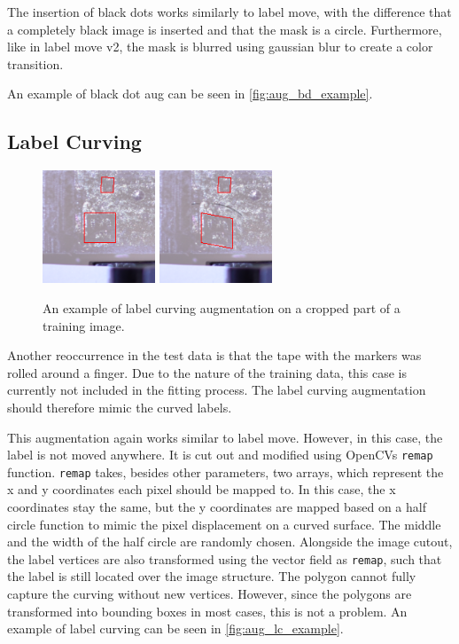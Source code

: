 \documentclass[10pt]{book}
\newcommand{\figureref}[1]{\autoref{#1}}
\begin{document}
The insertion of black dots works similarly to label move, with the difference that a completely black image is inserted and that the mask is a circle. Furthermore, like in label move v2, the mask is blurred using gaussian blur to create a color transition.

An example of black dot aug can be seen in \figureref{fig:aug_bd_example}.

\subsection{Label Curving}
\label{sec:label_curving}

\begin{figure}
  \centering
     {\includegraphics[width=0.3\textwidth]{image/aug_lc_before}}
     {\includegraphics[width=0.3\textwidth]{image/aug_lc_after}}
  \caption{An example of label curving augmentation on a cropped part of a training image.}
  \label{fig:aug_lc_example}
\end{figure}

Another reoccurrence in the test data is that the tape with the markers was rolled around a finger. Due to the nature of the training data, this case is currently not included in the fitting process. The label curving augmentation should therefore mimic the curved labels.

This augmentation again works similar to label move. However, in this case, the label is not moved anywhere. It is cut out and modified using \acp{OpenCV} \texttt{remap} function. \texttt{remap} takes, besides other parameters, two arrays, which represent the x and y coordinates each pixel should be mapped to. In this case, the x coordinates stay the same, but the y coordinates are mapped based on a half circle function to mimic the pixel displacement on a curved surface. The middle and the width of the half circle are randomly chosen. Alongside the image cutout, the label vertices are also transformed using the vector field as \texttt{remap}, such that the label is still located over the image structure. The polygon cannot fully capture the curving without new vertices. However, since the polygons are transformed into bounding boxes in most cases, this is not a problem. An example of label curving can be seen in \figureref{fig:aug_lc_example}.
\end{document}
